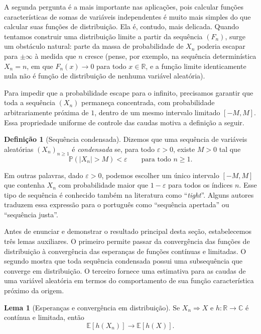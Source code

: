 \documentclass[12pt,portuguese]{article}
\theoremstyle{definition}
\newtheorem{definition}[definition]{Definição}
\newtheorem{lemma}[lemma]{Lema}
\theoremstyle{plainexercise}
\theoremstyle{starredexercise}
\theoremstyle{definition}
\begin{document}
A segunda pergunta é a mais importante nas aplicações, pois calcular funções
características de somas de variáveis independentes é muito mais simples do que
calcular suas funções de distribuição. Ela é, contudo, mais delicada. Quando
tentamos construir uma distribuição limite a partir da sequência $(F_n)$, surge
um obstáculo natural: parte da massa de probabilidade de $X_n$ poderia escapar
para $\pm\infty$ à medida que $n$ cresce (pense, por exemplo, na sequência
determinística $X_n=n$, em que $F_n(x)\to0$ para todo $x\in\mathbb{R}$, e a
função limite identicamente nula não é função de distribuição de nenhuma variável
aleatória).

\bigskip

Para impedir que a probabilidade escape para o infinito, precisamos garantir que
toda a sequência $(X_n)$ permaneça concentrada, com probabilidade arbitrariamente
próxima de $1$, dentro de um mesmo intervalo limitado $[-M,M]$. Essa propriedade
uniforme de controle das caudas motiva a definição a seguir.

\begin{definition}[Sequência condensada]\label{def:sequencia-condensada}
Dizemos que uma sequência de variáveis aleatórias $(X_n)_{n\geqslant1}$ é
\emph{condensada} se, para todo $\varepsilon>0$, existe $M>0$ tal que
\[
\mathbb{P}(|X_n|>M)<\varepsilon
\qquad\text{para todo }n\geqslant1.
\]
\end{definition}

Em outras palavras, dado $\varepsilon>0$, podemos escolher um único intervalo
$[-M,M]$ que contenha $X_n$ com probabilidade maior que $1-\varepsilon$ para
todos os índices $n$. Esse tipo de sequência é conhecido também na literatura
como ``\emph{tight}''. Alguns autores traduzem essa expressão para o português
como ``sequência apertada'' ou ``sequência justa''.


\bigskip 

Antes de enunciar e demonstrar o resultado principal desta seção, estabelecemos
três lemas auxiliares. O primeiro permite passar da convergência das funções de
distribuição à convergência das esperanças de funções contínuas e limitadas. O
segundo mostra que toda sequência condensada possui uma subsequência que
converge em distribuição. O terceiro fornece uma estimativa para as caudas de
uma variável aleatória em termos do comportamento de sua função característica
próximo da origem.

\begin{lemma}[Esperanças e convergência em distribuição]\label{lem:dist-esperancas-limitadas}
Se $X_n\Rightarrow X$ e $h:\mathbb{R}\to\mathbb{C}$ é contínua e limitada,
então
\[
\mathbb{E}[h(X_n)]\longrightarrow\mathbb{E}[h(X)].
\]
\end{lemma}
\end{document}
